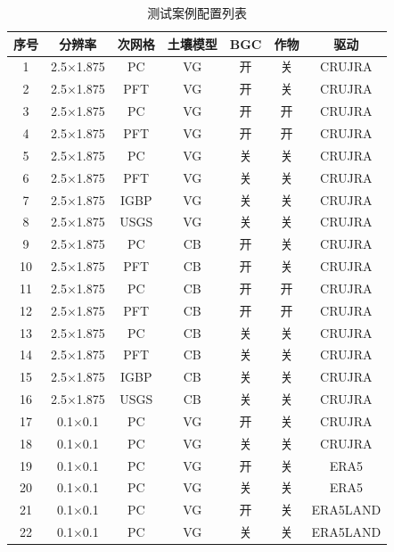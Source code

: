 \begin{table}[!htbp]
\renewcommand{\arraystretch}{1.5}
\centering
\caption{测试案例配置列表}\label{测试列表}
\begin{tabular}{
ccccccc} \toprule
\textbf{序号} & \textbf{分辨率} & \textbf{次网格} & \textbf{土壤模型} & \textbf{BGC} & \textbf{作物} & \textbf{驱动} \\ \midrule
1 & 2.5$\times$1.875 & PC & VG & 开 & 关 & CRUJRA \\
2 & 2.5$\times$1.875 & PFT & VG & 开 & 关 & CRUJRA \\
3 & 2.5$\times$1.875 & PC & VG & 开 & 开 & CRUJRA \\
4 & 2.5$\times$1.875 & PFT & VG & 开 & 开 & CRUJRA \\
5 & 2.5$\times$1.875 & PC & VG & 关 & 关 & CRUJRA \\
6 & 2.5$\times$1.875 & PFT & VG & 关 & 关 & CRUJRA \\
7 & 2.5$\times$1.875 & IGBP & VG & 关 & 关 & CRUJRA \\
8 & 2.5$\times$1.875 & USGS & VG & 关 & 关 & CRUJRA \\
9 & 2.5$\times$1.875 & PC & CB & 开 & 关 & CRUJRA \\
10 & 2.5$\times$1.875 & PFT & CB & 开 & 关 & CRUJRA \\
11 & 2.5$\times$1.875 & PC & CB & 开 & 开 & CRUJRA \\
12 & 2.5$\times$1.875 & PFT & CB & 开 & 开 & CRUJRA \\
13 & 2.5$\times$1.875 & PC & CB & 关 & 关 & CRUJRA \\
14 & 2.5$\times$1.875 & PFT & CB & 关 & 关 & CRUJRA \\
15 & 2.5$\times$1.875 & IGBP & CB & 关 & 关 & CRUJRA \\
16 & 2.5$\times$1.875 & USGS & CB & 关 & 关 & CRUJRA \\
17 & 0.1$\times$0.1 & PC & VG & 开 & 关 & CRUJRA \\
18 & 0.1$\times$0.1 & PC & VG & 关 & 关 & CRUJRA \\
19 & 0.1$\times$0.1 & PC & VG & 开 & 关 & ERA5 \\
20 & 0.1$\times$0.1 & PC & VG & 关 & 关 & ERA5 \\
21 & 0.1$\times$0.1 & PC & VG & 开 & 关 & ERA5LAND \\
22 & 0.1$\times$0.1 & PC & VG & 关 & 关 & ERA5LAND \\
\bottomrule
\end{tabular}
\end{table}


